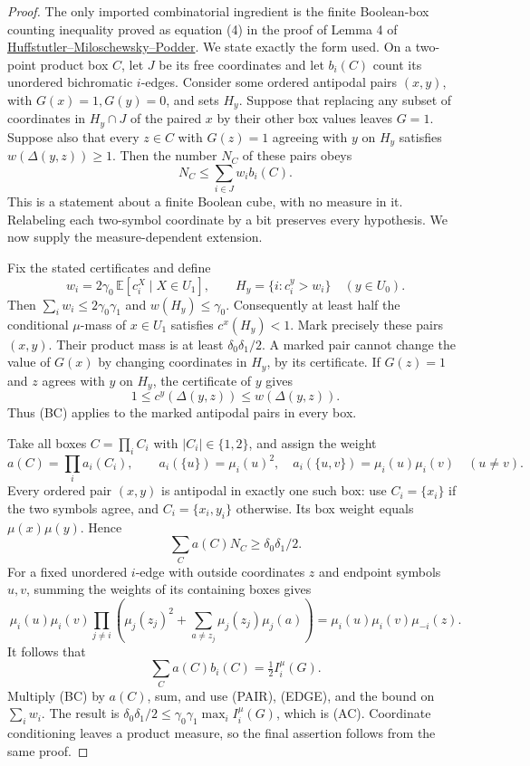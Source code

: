 \begin{proof}
The only imported combinatorial ingredient is the finite Boolean-box
counting inequality proved as equation (4) in the proof of Lemma 4 of
\href{https://arxiv.org/abs/2611.12795}
{Huffstutler--Miloschewsky--Podder}.
We state exactly the form used. On a two-point product box \(C\), let
\(J\) be its free coordinates and let \(b_i(C)\) count its
unordered bichromatic \(i\)-edges. Consider some ordered antipodal
pairs \((x,y)\), with \(G(x)=1,G(y)=0\), and sets \(H_y\).
Suppose that replacing any subset of coordinates in \(H_y\cap J\)
of the paired \(x\) by their other box values leaves \(G=1\).
Suppose also that every \(z\in C\) with \(G(z)=1\) agreeing with
\(y\) on \(H_y\) satisfies \(w(\Delta(y,z))\ge1\).
Then the number \(N_C\) of these pairs obeys
\[
 N_C\le\sum_{i\in J}w_i b_i(C).                 \tag{BC}
\]
This is a statement about a finite Boolean cube, with no measure in it.
Relabeling each two-symbol coordinate by a bit preserves every
hypothesis. We now supply the measure-dependent extension.

Fix the stated certificates and define
\[
 w_i=2\gamma_0\,\mathbb E[c_i^X\mid X\in U_1],
 \qquad H_y=\{i:c_i^y>w_i\}\quad(y\in U_0).
\]
Then \(\sum_iw_i\le2\gamma_0\gamma_1\) and
\(w(H_y)\le\gamma_0\). Consequently at least half the conditional
\(\mu\)-mass of \(x\in U_1\) satisfies \(c^x(H_y)<1\).
Mark precisely these pairs \((x,y)\). Their product mass is at least
\(\delta_0\delta_1/2\). A marked pair cannot change the value of
\(G(x)\) by changing coordinates in \(H_y\), by its certificate.
If \(G(z)=1\) and \(z\) agrees with \(y\) on \(H_y\), the
certificate of \(y\) gives
\[
 1\le c^y(\Delta(y,z))\le w(\Delta(y,z)).
\]
Thus (BC) applies to the marked antipodal pairs in every box.

Take all boxes \(C=\prod_i C_i\) with \(|C_i|\in\{1,2\}\),
and assign the weight
\[
 a(C)=\prod_i a_i(C_i),\qquad
 a_i(\{u\})=\mu_i(u)^2,
 \quad a_i(\{u,v\})=\mu_i(u)\mu_i(v)\quad(u\ne v).
\]
Every ordered pair \((x,y)\) is antipodal in exactly one such box:
use \(C_i=\{x_i\}\) if the two symbols agree, and
\(C_i=\{x_i,y_i\}\) otherwise. Its box weight equals
\(\mu(x)\mu(y)\). Hence
\[
 \sum_C a(C)N_C\ge\delta_0\delta_1/2.             \tag{PAIR}
\]
For a fixed unordered \(i\)-edge with outside coordinates \(z\)
and endpoint symbols \(u,v\), summing the weights of its containing
boxes gives
\[
 \mu_i(u)\mu_i(v)
 \prod_{j\ne i}\left(\mu_j(z_j)^2+
               \sum_{a\ne z_j}\mu_j(z_j)\mu_j(a)\right)
 =\mu_i(u)\mu_i(v)\mu_{-i}(z).
\]
It follows that
\[
 \sum_C a(C)b_i(C)=\tfrac12 I_i^\mu(G).            \tag{EDGE}
\]
Multiply (BC) by \(a(C)\), sum, and use (PAIR), (EDGE), and the
bound on \(\sum_iw_i\). The result is
\(\delta_0\delta_1/2\le\gamma_0\gamma_1\max_i I_i^\mu(G)\),
which is (AC). Coordinate conditioning leaves a product measure, so
the final assertion follows from the same proof.
\end{proof}

